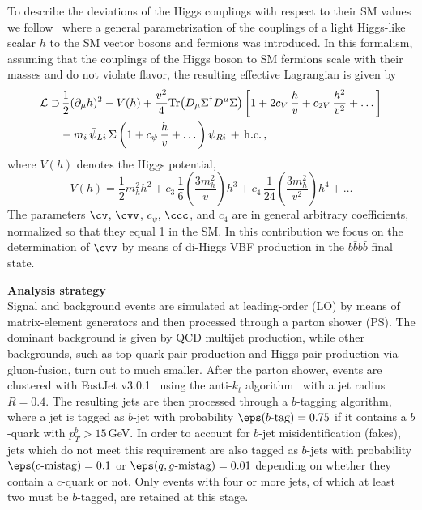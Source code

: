 To describe the deviations of the Higgs couplings with respect to their SM values we follow~\cite{Contino:2010mh} where a general parametrization of the	couplings of a light Higgs-like scalar $h$ to the SM vector bosons and fermions was introduced.
%
In this formalism, assuming that the couplings of the Higgs boson to SM fermions scale with their masses and
do not violate flavor, the resulting effective Lagrangian is given by
\begin{equation}
\label{eq:lagrangian}
\begin{split}
{\cal L}  \supset
& \, \frac{1}{2}(\partial_\mu h)^2 - V(h) +\frac{v^2}{4}{\rm Tr}\!\left (D_\mu \Sigma^\dagger D^\mu \Sigma\right )
\left [ 1+2c_V\, \frac{h}{v}+c_{2V}\,\frac{h^2}{v^2}+\dots\right ] \\
&-m_i\,\bar \psi_{Li}\, \Sigma\left (1+c_{\psi}\,\frac{h}{v} + \dots \right)\psi_{Ri}\,+\,{\rm h.c.}\, ,
\end{split}
\end{equation}
%
where $V(h)$ denotes the Higgs potential, 
%
\begin{equation}
\label{eq:potential}
V(h) = \frac{1}{2} m_h^2 h^2 + c_3\, \frac{1}{6} \left( \frac{3m_h^2}{v} \right) h^3 + c_4\, \frac{1}{24} \left( \frac{3m_h^2}{v^2} \right) h^4 + \dots
\end{equation}
%
The parameters $\cv$, $\cvv$, $c_{\psi}$, $\ccc$, and $c_4$ are in general
arbitrary coefficients, normalized so that they equal 1 in the SM.
%
In this contribution we focus on the determination of $\cvv$ by means
of di-Higgs VBF production in the $b\bar{b}b\bar{b}$ final state.

\noindent
{\bf Analysis strategy}\\
Signal and background events are simulated at leading-order (LO) by means of
matrix-element  generators and then processed through a parton shower (PS).
%
The dominant background is given by QCD multijet production,
while other backgrounds, such as top-quark pair production and 
Higgs pair production via
gluon-fusion, turn out to much smaller.
%
After the parton shower, events are clustered with 
{\sc\small FastJet} v3.0.1~\cite{Cacciari:2011ma} using the
anti-$k_t$ algorithm~\cite{Cacciari:2008gp} with a jet radius $R=0.4$.
%
The resulting jets are then processed through a $b$-tagging algorithm,
where a jet is tagged as $b$-jet with probability $\eps(b\text{-tag})=0.75$ 
if it contains a $b$-quark with $p_T^b > 15\,$GeV.
%
In order to account for $b$-jet misidentification (fakes),
jets which do not meet this requirement
are also tagged as $b$-jets with probability $\eps(c\text{-mistag})=0.1$ or $\eps(q,g\text{-mistag})=0.01$
depending on whether they contain a $c$-quark or not.
%
Only events with four or more jets, of which at least two
must be $b$-tagged, are retained at this stage.

